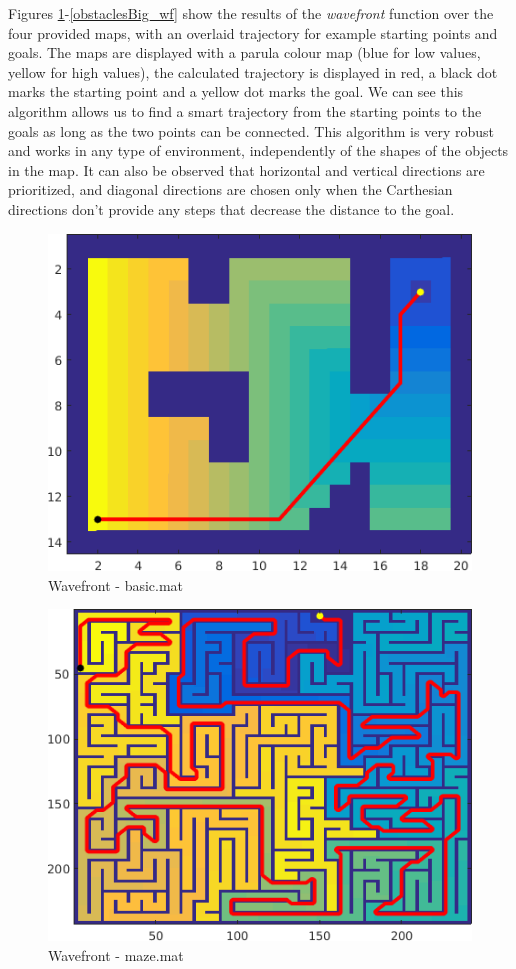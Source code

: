 \documentclass[journal]{IEEEtran}
\begin{document}
Figures \ref{basic_wf}-\ref{obstaclesBig_wf} show the results of the \textit{wavefront} function over the four provided maps, with an overlaid trajectory for example starting points and goals. The maps are displayed with a parula colour map (blue for low values, yellow for high values), the calculated trajectory is displayed in red, a black dot marks the starting point and a yellow dot marks the goal. We can see this algorithm allows us to find a smart trajectory from the starting points to the goals as long as the two points can be connected. This algorithm is very robust and works in any type of environment, independently of the shapes of the objects in the map. It can also be observed that horizontal and vertical directions are prioritized, and diagonal directions are chosen only when the Carthesian directions don't provide any steps that decrease the distance to the goal.

\begin{figure}\label{basic_wf}
	\centering
	\includegraphics[width=0.8\linewidth]{figures/basic_wf.png}
	\caption{Wavefront - basic.mat}
\end{figure}

\begin{figure}\label{maze_wf}
	\centering
	\includegraphics[width=0.8\linewidth]{figures/maze_wf.png}
	\caption{Wavefront - maze.mat}
\end{figure}
\end{document}

